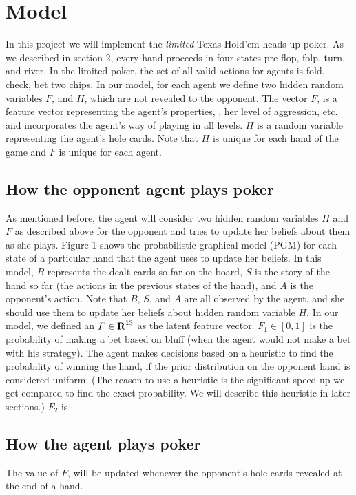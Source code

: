 \section{Model}
In this project we will implement the \emph{limited} Texas Hold'em heads-up poker. As we
described in section 2, every hand proceeds in four states pre-flop, folp, 
turn, and river. In the limited poker, the set of all valid actions 
for agents is fold, check, bet two chips. In our model, for each agent
we define two hidden random variables $F$, and $H$, which are not revealed to the
opponent. 
The vector $F$, is a feature vector representing the agent's properties, \ie, her 
level of aggression, etc. and incorporates the 
agent's way of playing in all levels. 
$H$ is a random
variable representing the agent's hole cards. Note that $H$ is unique for 
each hand of the game and $F$ is unique for each agent.

\subsection{How the opponent agent plays poker}
As mentioned before, 
the agent will consider two hidden random variables $H$ and $F$ as described above 
for the opponent and tries to update her beliefs about them as she plays. Figure 1 shows the
probabilistic graphical model (PGM) for each state of a 
particular hand that the agent uses to update her 
beliefs. In this model, $B$ represents the dealt cards so far on the board, $S$ is the 
story of the hand so far (\ie the actions in the previous states of the hand), and 
$A$ is the opponent's action. Note that $B$, $S$, and $A$ are all observed by the
agent, and she should use them to update her beliefs about hidden random variable
$H$. 
In our model, we defined an $F\in{\mbox{\bf R}}^{13}$ as the latent feature vector.
$F_1\in[0,1]$ is the probability of making a bet based on bluff (when the agent would not
make a bet with his strategy). The agent makes decisions based on a heuristic to find
the probability of winning the hand, if the prior distribution on the opponent hand is
considered uniform. 
(The reason to use a heuristic is the significant speed up we get compared to find the
exact probability. We will describe this heuristic in later sections.)
$F_2$ is

\subsection {How the agent plays poker}

The value of $F$, will be updated whenever the opponent's hole cards revealed
at the end of a hand. 


